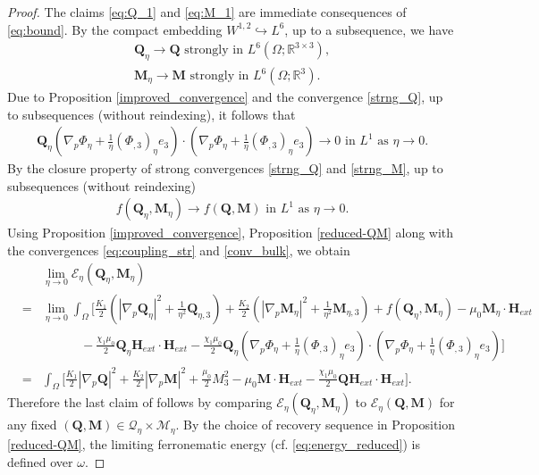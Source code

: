 \documentclass{article}
\def\Qvec{\mathbf{Q}}
\def \Mvec{\mathbf{M}}
\def\Hvec{\mathbf{H}}
\begin{document}
\begin{proof}
The claims \eqref{eq:Q_1} and \eqref{eq:M_1} are immediate consequences of \eqref{eq:bound}. By the compact embedding $W^{1,2}\hookrightarrow L^6$, up to a subsequence, we have
\begin{eqnarray}
\Qvec_{\eta}\rightarrow\Qvec \mbox{ strongly in } L^6\left(\Omega; \mathbb R^{3\times 3}\right),\label{strng_Q}\\
\Mvec_{\eta}\rightarrow\Mvec \mbox{ strongly in } L^6\left(\Omega; \mathbb R^{3}\right).\label{strng_M}
\end{eqnarray}
Due to Proposition \ref{improved_convergence} and the convergence \eqref{strng_Q}, up to subsequences (without reindexing), it follows that
\begin{eqnarray}
\Qvec_{\eta}\left(\nabla_p\Phi_{\eta}+\frac{1}{\eta}\left(\Phi_{,3}\right)_{\eta}e_3\right)\cdot\left(\nabla_p\Phi_{\eta}+\frac{1}{\eta}\left(\Phi_{,3}\right)_{\eta}e_3\right)\rightarrow 0 \mbox{ in } L^1 \mbox{ as } \eta\rightarrow 0.\label{eq:coupling_str}
\end{eqnarray}
By the closure property of strong convergences \eqref{strng_Q} and \eqref{strng_M}, up to subsequences (without reindexing)
\begin{eqnarray}
f\left(\Qvec_{\eta}, \Mvec_{\eta}\right)\rightarrow f\left(\Qvec, \Mvec\right) \mbox{ in } L^1 \mbox{ as } \eta\rightarrow 0.\label{conv_bulk}
\end{eqnarray}
Using Proposition \ref{improved_convergence}, Proposition \ref{reduced-QM} along with the convergences \eqref{eq:coupling_str} and \eqref{conv_bulk}, we obtain
\begin{eqnarray}
& &\lim_{\eta\rightarrow 0}\mathcal{E}_{\eta}\left(\Qvec_{\eta}, \Mvec_{\eta}\right)\nonumber\\
&=&\lim_{\eta\rightarrow 0}\int_{\Omega}\biggr[\frac{K_1}{2}\left(|\nabla_p\Qvec_{\eta}|^2+\frac{1}{\eta^2}\Qvec_{\eta,3}\right)+\frac{K_2}{2}\left(|\nabla_p\Mvec_{\eta}|^2+\frac{1}{\eta^2}\Mvec_{\eta,3}\right)+f\left(\Qvec_{\eta}, \Mvec_{\eta}\right)-\mu_0\Mvec_{\eta}\cdot\Hvec_{ext}\nonumber\\
& &~~~~~~~~~~~~~~- \frac{\chi_1\mu_0}{2}\Qvec_{\eta}\Hvec_{ext}\cdot\Hvec_{ext}- \frac{\chi_1\mu_0}{2}\Qvec_{\eta}\left(\nabla_p\Phi_{\eta}+\frac{1}{\eta}\left(\Phi_{,3}\right)_{\eta}e_3\right)\cdot\left(\nabla_p\Phi_{\eta}+\frac{1}{\eta}\left(\Phi_{,3}\right)_{\eta}e_3\right)\biggr]\nonumber\\
&=&\int_{\Omega}\bigg[\frac{K_1}{2}|\nabla_p\Qvec|^2+\frac{K_2}{2}|\nabla_p\Mvec|^2+\frac{\mu_0}{2}M_3^2-\mu_0\Mvec\cdot\Hvec_{ext}-\frac{\chi_1\mu_0}{2}\Qvec\Hvec_{ext}\cdot\Hvec_{ext}\bigg].
\end{eqnarray}
Therefore the last claim of  follows by comparing $\mathcal{E}_{\eta}\left(\Qvec_{\eta}, \Mvec_{\eta}\right)$ to $\mathcal{E}_{\eta}\left(\Qvec, \Mvec\right)$ for any fixed $\left(\Qvec, \Mvec\right)\in\mathcal{Q}_{\eta}\times\mathcal{M}_{\eta}$. By the choice of recovery sequence in Proposition \ref{reduced-QM}, the limiting ferronematic energy (cf. \eqref{eq:energy_reduced}) is defined over $\omega$.
\end{proof}
\end{document}
